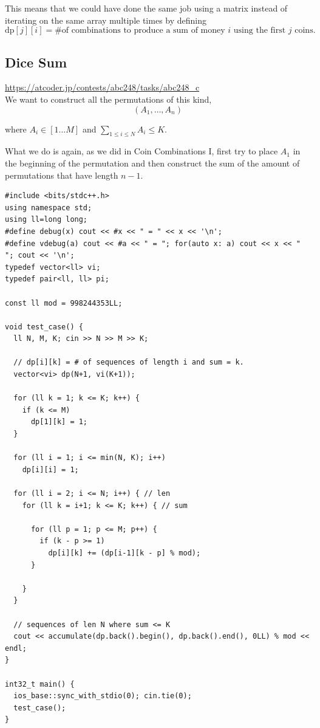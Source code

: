 This means that we could have done the same job using a matrix instead of iterating on the same array multiple times by defining
\begin{equation}
    \text{dp}[j][i] = \text{\# of combinations to produce a sum of money $i$ using the first $j$ coins}.
\end{equation}

\subsection{Dice Sum}
\url{https://atcoder.jp/contests/abc248/tasks/abc248_c} \\ 

We want to construct all the permutations of this kind,
\begin{equation}
    (A_1, \dots, A_n)
\end{equation}

where $A_i \in [1 \dots M]$ and $\sum_{1 \leq i\leq N}{A_i} \leq K$.

What we do is again, as we did in Coin Combinations I, first try to place $A_1$ in the beginning of the permutation and then construct the sum of the amount of permutations that have length $n - 1$. 

\begin{verbatim}
#include <bits/stdc++.h>
using namespace std;
using ll=long long;
#define debug(x) cout << #x << " = " << x << '\n';
#define vdebug(a) cout << #a << " = "; for(auto x: a) cout << x << " "; cout << '\n';
typedef vector<ll> vi;
typedef pair<ll, ll> pi;

const ll mod = 998244353LL;

void test_case() {
  ll N, M, K; cin >> N >> M >> K;

  // dp[i][k] = # of sequences of length i and sum = k.
  vector<vi> dp(N+1, vi(K+1));

  for (ll k = 1; k <= K; k++) {
    if (k <= M)
      dp[1][k] = 1;
  }

  for (ll i = 1; i <= min(N, K); i++)
    dp[i][i] = 1;
  
  for (ll i = 2; i <= N; i++) { // len
    for (ll k = i+1; k <= K; k++) { // sum

      for (ll p = 1; p <= M; p++) {
        if (k - p >= 1)
          dp[i][k] += (dp[i-1][k - p] % mod);
      }

    }
  }

  // sequences of len N where sum <= K
  cout << accumulate(dp.back().begin(), dp.back().end(), 0LL) % mod << endl;
}

int32_t main() {
  ios_base::sync_with_stdio(0); cin.tie(0);
  test_case();
}
\end{verbatim}

